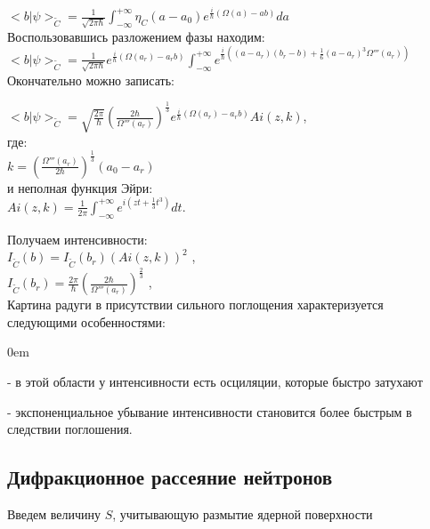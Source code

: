 \documentclass[11pt]{report}
\begin{document}
$<b|\psi>_{\tilde C} = \frac{1}{\sqrt{2\pi\hbar }} \int_{-∞}^{+∞} \eta_C(a-a_0)e^{\frac{i}{\hbar}(\Omega(a)-ab)}da$ \\

Воспользовавшись разложением фазы находим: \\

$<b|\psi>_{\tilde C} = \frac{1}{\sqrt{2\pi\hbar }} e^{\frac{i}{\hbar}(\Omega(a_r) - a_rb )} \int_{-∞}^{+∞} e^{\frac{i}{\hbar}((a-a_r)(b_r-b)+\frac{1}{6}(a-a_r)^3\Omega'''(a_r))}$ \\

Окончательно можно записать:

$<b|\psi>_{\tilde C} = 
\sqrt{\frac{2\pi}{\hbar}}
(\frac{2\hbar}{\Omega'''(a_r)})^{\frac{1}{3}}
e^{\frac{i}{\hbar}(\Omega(a_r)-a_rb)}Ai(z,k)$,\\

где: \\

$k = (\frac{\Omega'''(a_r)}{2\hbar })^{\frac{1}{3}}(a_0-a_r) $ \\

и неполная функция Эйри: \\

$Ai(z,k) = \frac{1}{2\pi} \int_{-∞}^{+∞}e^{i(zt+\frac{1}{3}t^3)}dt $.

Получаем интенсивности: \\

$I_{\tilde C}(b) = I_{\tilde C}(b_r)(Ai(z,k))^2$ ,\\

$I_{\tilde C}(b_r) = \frac{2\pi}{\hbar}(\frac{2\hbar }{\Omega'''(a_r)})^{\frac{2}{3}}$ ,\\

Картина радуги в присутствии сильного поглощения характеризуется следующими особенностями:
\begin{description}
\addtolength{\itemindent}{0.80cm}
\itemsep0em 
\item[$b<b_r$] - в этой области у интенсивности есть осциляции, которые быстро затухают
\item[$b>b_r$] - экспоненциальное убывание интенсивности становится более быстрым в следствии поглошения.
\end{description}

\subsection{Дифракционное рассеяние нейтронов}
Введем величину $S$, учитывающую размытие ядерной поверхности\\
\end{document}
